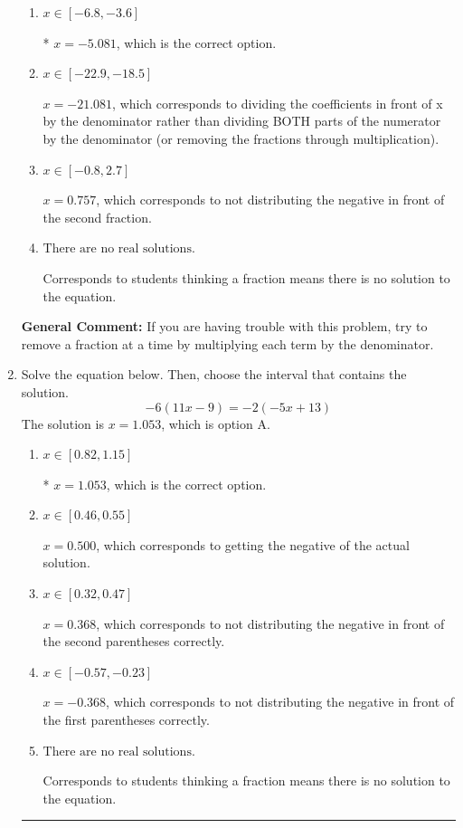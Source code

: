 \documentclass{extbook}[14pt]
\newcommand{\litem}[1]{\item #1

\rule{\textwidth}{0.4pt}}
\begin{document}
\begin{enumerate}
{\begin{enumerate}[label=\Alph*.]
 $x = -1.044$, which corresponds to dividing the second number in the numerator by the denominator rather than dividing BOTH parts of the numerator by the denominator (or removing the fractions through multiplication).
\item \( x \in [-6.8, -3.6] \)

* $x = -5.081$, which is the correct option.
\item \( x \in [-22.9, -18.5] \)

 $x = -21.081$, which corresponds to dividing the coefficients in front of x by the denominator rather than dividing BOTH parts of the numerator by the denominator (or removing the fractions through multiplication).
\item \( x \in [-0.8, 2.7] \)

 $x = 0.757$, which corresponds to not distributing the negative in front of the second fraction.
\item \( \text{There are no real solutions.} \)

Corresponds to students thinking a fraction means there is no solution to the equation.
\end{enumerate}

\textbf{General Comment:} If you are having trouble with this problem, try to remove a fraction at a time by multiplying each term by the denominator.
}
\litem{
Solve the equation below. Then, choose the interval that contains the solution.
\[ -6(11x -9) = -2(-5x + 13) \]The solution is \( x = 1.053 \), which is option A.\begin{enumerate}[label=\Alph*.]
\item \( x \in [0.82, 1.15] \)

* $x = 1.053$, which is the correct option.
\item \( x \in [0.46, 0.55] \)

$x = 0.500$, which corresponds to getting the negative of the actual solution.
\item \( x \in [0.32, 0.47] \)

$x = 0.368$, which corresponds to not distributing the negative in front of the second parentheses correctly.
\item \( x \in [-0.57, -0.23] \)

$x = -0.368$, which corresponds to not distributing the negative in front of the first parentheses correctly.
\item \( \text{There are no real solutions.} \)

Corresponds to students thinking a fraction means there is no solution to the equation.
\end{enumerate}

}
\end{enumerate}
\end{document}
